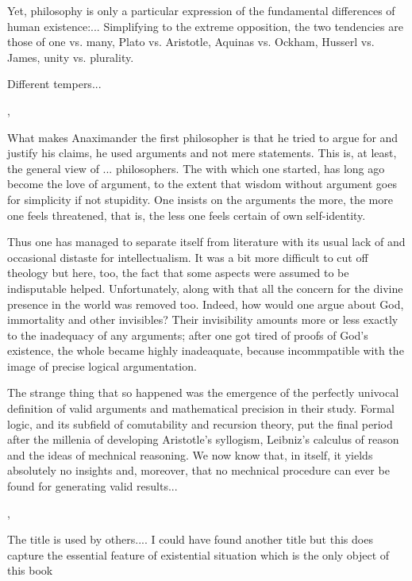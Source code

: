 {

Yet, philosophy is only a particular expression of the fundamental
differences of human existence:... Simplifying to the extreme
opposition, the two tendencies are those of one vs. many, Plato vs. Aristotle,
Aquinas vs. Ockham, Husserl vs. James, unity vs. plurality. 

Different tempers...


\sep

What makes Anaximander the first philosopher is that he tried to argue for and
justify his claims, he used arguments and not mere statements. This is, at
least, the general view of ... philosophers. The  with
which one started, has long ago become the love of argument, to the extent that
wisdom without argument goes for simplicity if not stupidity.  One insists on
the arguments the more, the more one feels threatened, that is, the less one
feels certain of own self-identity.

Thus one has managed to separate itself from
literature with its usual lack of and occasional distaste for intellectualism.
It was a bit more difficult to cut off theology but here, too, the fact that
some aspects were assumed to be indisputable helped. Unfortunately, along with
that all the concern for the divine presence in the world was removed too.
Indeed, how would one argue about God, immortality and other invisibles? Their
invisibility amounts more or less exactly to the inadequacy of any arguments;
after one got tired of proofs of God's existence, the whole  became
highly inadeaquate, because incommpatible with the image of precise  logical
argumentation.

The strange thing that so happened was the emergence of the perfectly univocal
definition of valid arguments and mathematical precision in their study. Formal
logic, and its subfield of comutability and recursion theory, put the final
period after the millenia of developing Aristotle's syllogism, Leibniz's
calculus of reason and the ideas of mechnical reasoning. We now know that, in
itself, it yields absolutely no insights and, moreover, that no mechnical
procedure can ever be found for generating valid results...



\sep

The title is used by others....
I could have found another title but this does capture the
essential feature of existential situation which is the
only object of this book


}
